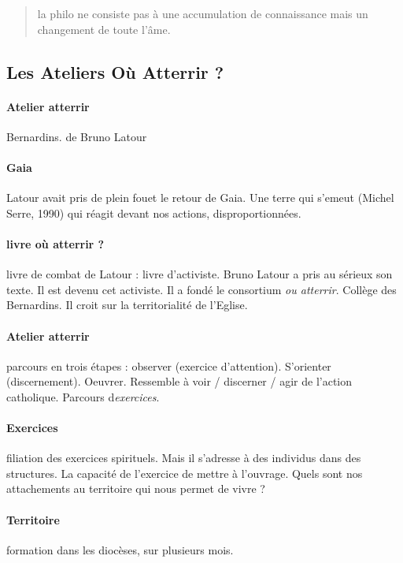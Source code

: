  \begin{quote}
    la philo ne consiste pas à une accumulation de connaissance mais un changement de toute l'âme.  
 \end{quote}
\subsection{Les Ateliers Où Atterrir ?}

 \paragraph{Atelier atterrir} Bernardins. de Bruno Latour

 \paragraph{Gaia} Latour avait pris de plein fouet le retour de Gaia. Une terre qui s'emeut (Michel Serre, 1990) qui réagit devant nos actions, disproportionnées.

 \paragraph{livre où atterrir ?} livre de combat de Latour : livre d'activiste. Bruno Latour a pris au sérieux son texte. Il est devenu cet activiste. Il a fondé le consortium \textit{ou atterrir}. Collège des Bernardins. 
 Il croit sur la territorialité de l'Eglise. 

 \paragraph{Atelier atterrir} parcours en trois étapes : observer (exercice d'attention). S'orienter (discernement). Oeuvrer. 
 Ressemble à voir / discerner / agir de l'action catholique. 
 Parcours d\textit{exercices}.
 \paragraph{Exercices } filiation des exercices spirituels. Mais il s'adresse à des individus dans des structures.
 La capacité de l'exercice de mettre à l'ouvrage. 
 Quels sont nos attachements au territoire qui nous permet de vivre ? 

 \paragraph{Territoire} formation dans les diocèses, sur plusieurs mois.



